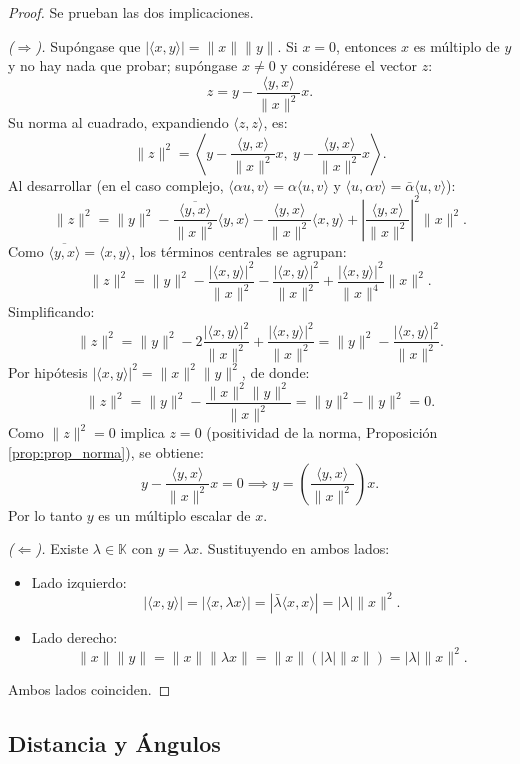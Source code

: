 \documentclass[11pt, a4paper]{article}
\begin{document}
\begin{proof}
Se prueban las dos implicaciones.

\textit{($\Rightarrow$).} Supóngase que $|\langle x, y \rangle| = \|x\| \|y\|$. Si $x = 0$, entonces
$x$ es múltiplo de $y$ y no hay nada que probar; supóngase $x \neq 0$ y considérese el vector $z$:
\[
z = y - \frac{\langle y, x \rangle}{\|x\|^2} x.
\]
Su norma al cuadrado, expandiendo $\langle z, z \rangle$, es:
\[
\|z\|^2 = \left\langle y - \frac{\langle y, x \rangle}{\|x\|^2} x, \ y - \frac{\langle y, x \rangle}{\|x\|^2} x \right\rangle.
\]
Al desarrollar (en el caso complejo, $\langle \alpha u, v \rangle = \alpha \langle u, v \rangle$ y $\langle u, \alpha v \rangle = \bar{\alpha} \langle u, v \rangle$):
\[
\|z\|^2 = \|y\|^2 - \frac{\overline{\langle y, x \rangle}}{\|x\|^2}\langle y, x \rangle - \frac{\langle y, x \rangle}{\|x\|^2}\langle x, y \rangle + \left| \frac{\langle y, x \rangle}{\|x\|^2} \right|^2 \|x\|^2.
\]
Como $\overline{\langle y, x \rangle} = \langle x, y \rangle$, los términos centrales se agrupan:
\[
\|z\|^2 = \|y\|^2 - \frac{|\langle x, y \rangle|^2}{\|x\|^2} - \frac{|\langle x, y \rangle|^2}{\|x\|^2} + \frac{|\langle x, y \rangle|^2}{\|x\|^4} \|x\|^2.
\]
Simplificando:
\[
\|z\|^2 = \|y\|^2 - 2\frac{|\langle x, y \rangle|^2}{\|x\|^2} + \frac{|\langle x, y \rangle|^2}{\|x\|^2} = \|y\|^2 - \frac{|\langle x, y \rangle|^2}{\|x\|^2}.
\]
Por hipótesis $|\langle x, y \rangle|^2 = \|x\|^2 \|y\|^2$, de donde:
\[
\|z\|^2 = \|y\|^2 - \frac{\|x\|^2 \|y\|^2}{\|x\|^2} = \|y\|^2 - \|y\|^2 = 0.
\]
Como $\|z\|^2 = 0$ implica $z = 0$ (positividad de la norma, Proposición \ref{prop:prop_norma}), se obtiene:
\[
y - \frac{\langle y, x \rangle}{\|x\|^2} x = 0 \implies y = \left( \frac{\langle y, x \rangle}{\|x\|^2} \right) x.
\]
Por lo tanto $y$ es un múltiplo escalar de $x$.

\textit{($\Leftarrow$).} Existe $\lambda \in \mathbb{K}$ con $y = \lambda x$. Sustituyendo en ambos lados:
\begin{itemize}
    \item Lado izquierdo:
    \[
    |\langle x, y \rangle| = |\langle x, \lambda x \rangle| = |\bar{\lambda} \langle x, x \rangle| = |\lambda| \|x\|^2.
    \]
    \item Lado derecho:
    \[
    \|x\| \|y\| = \|x\| \|\lambda x\| = \|x\| (|\lambda| \|x\|) = |\lambda| \|x\|^2.
    \]
\end{itemize}
Ambos lados coinciden.
\end{proof}

\subsection{Distancia y Ángulos}
\end{document}
